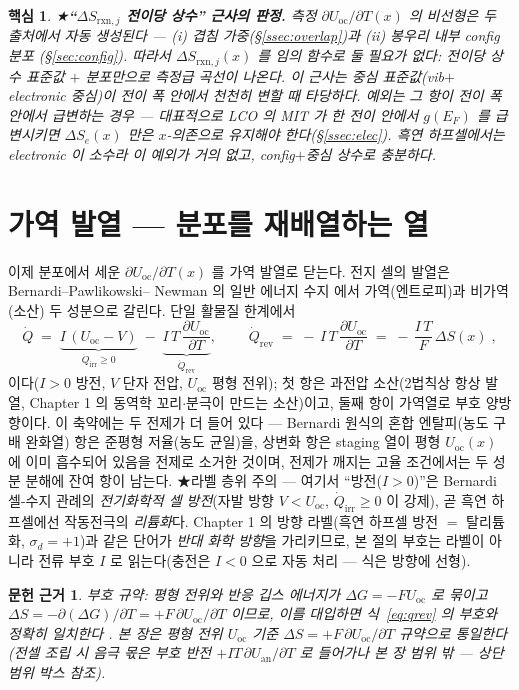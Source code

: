 \documentclass[11pt,a4paper]{article}
\newtheorem*{keybox}{핵심}
\newtheorem*{srcbox}{문헌 근거}
\newcommand{\rxn}{\mathrm{rxn}}
\newcommand{\rev}{\mathrm{rev}}
\newcommand{\irr}{\mathrm{irr}}
\newcommand{\oc}{\mathrm{oc}}
\begin{document}
\begin{keybox}
★\textbf{``$\Delta S_{\rxn,j}$ 전이당 상수'' 근사의 판정.} 측정 $\partial U_\oc/\partial T(x)$ 의 비선형은 두
출처에서 \emph{자동 생성}된다 — (i) 겹침 가중(\S\ref{ssec:overlap})과 (ii) 봉우리 내부 config 분포
(\S\ref{sec:config}). 따라서 $\Delta S_{\rxn,j}(x)$ 를 임의 함수로 둘 필요가 \emph{없다}: 전이당 \emph{상수}
표준값 $+$ 분포만으로 측정급 곡선이 나온다. 이 근사는 \emph{중심 표준값(vib$+$electronic 중심)이 전이 폭 안에서
천천히 변할 때} 타당하다. 예외는 그 항이 전이 폭 \emph{안에서} 급변하는 경우 — 대표적으로 LCO 의 MIT 가 한
전이 안에서 $g(E_F)$ 를 급변시키면 $\Delta S_e(x)$ 만은 $x$-의존으로 유지해야 한다(\S\ref{ssec:elec}). 흑연
하프셀에서는 electronic 이 소수라 이 예외가 거의 없고, config$+$중심 상수로 충분하다.
\end{keybox}

\section{가역 발열 — 분포를 재배열하는 열}\label{sec:revheat}
이제 분포에서 세운 $\partial U_\oc/\partial T(x)$ 를 가역 발열로 닫는다. 전지 셀의 발열은 Bernardi--Pawlikowski--
Newman 의 일반 에너지 수지 \cite{bernardi1985} 에서 가역(엔트로피)과 비가역(소산) 두 성분으로 갈린다. 단일
활물질 한계에서
\begin{equation}
\dot Q \;=\; \underbrace{I\,(U_\oc-V)}_{\dot Q_\irr\ge0}\;-\;\underbrace{I\,T\,\frac{\partial U_\oc}{\partial T}}_{\dot Q_\rev},
\qquad
\boxed{\;\dot Q_\rev \;=\; -\,I\,T\,\frac{\partial U_\oc}{\partial T}\;=\;-\,\frac{I\,T}{F}\,\Delta S(x)\;,}
\label{eq:qrev}
\end{equation}
이다($I>0$ 방전, $V$ 단자 전압, $U_\oc$ 평형 전위); 첫 항은 과전압 소산(2법칙상 항상 발열, Chapter 1 의
동역학 꼬리$\cdot$분극이 만드는 소산)이고, 둘째 항이 가역열로 부호 양방향이다. 이 축약에는 두 전제가
더 들어 있다 — Bernardi 원식의 혼합 엔탈피(농도 구배 완화열) 항은 준평형 저율(농도 균일)을, 상변화 항은
staging 열이 평형 $U_\oc(x)$ 에 이미 흡수되어 있음을 전제로 소거한 것이며, 전제가 깨지는 고율
조건에서는 두 성분 분해에 잔여 항이 남는다.
★라벨 층위 주의 — 여기서 ``방전($I>0$)''은 Bernardi 셀-수지 관례의 \emph{전기화학적 셀 방전}(자발 방향
$V<U_\oc$, $\dot Q_\irr\ge0$ 이 강제), 곧 흑연 하프셀에선 작동전극의 \emph{리튬화}다. Chapter 1 의 방향
라벨(흑연 하프셀 방전 $=$ 탈리튬화, $\sigma_d{=}+1$)과 같은 단어가 \emph{반대 화학 방향}을 가리키므로,
본 절의 부호는 라벨이 아니라 전류 부호 $I$ 로 읽는다(충전은 $I<0$ 으로 자동 처리 — 식은 방향에 선형).
\begin{srcbox}
부호 규약: 평형 전위와 반응 깁스 에너지가 $\Delta G=-FU_\oc$ 로 묶이고 $\Delta S=-\partial(\Delta G)/\partial T
=+F\,\partial U_\oc/\partial T$ 이므로, 이를 대입하면 식~\eqref{eq:qrev} 의 부호와 정확히 일치한다 \cite{newman,msmr_partI}. 본 장은 평형 전위 $U_\oc$ 기준 $\Delta S=+F\,\partial U_\oc/\partial T$ 규약으로 통일한다(전셀 조립 시 음극 몫은 부호 반전 $+IT\,\partial U_\mathrm{an}/\partial T$ 로 들어가나 본 장 범위 밖 — 상단 범위 박스 참조).
\end{srcbox}
\end{document}
